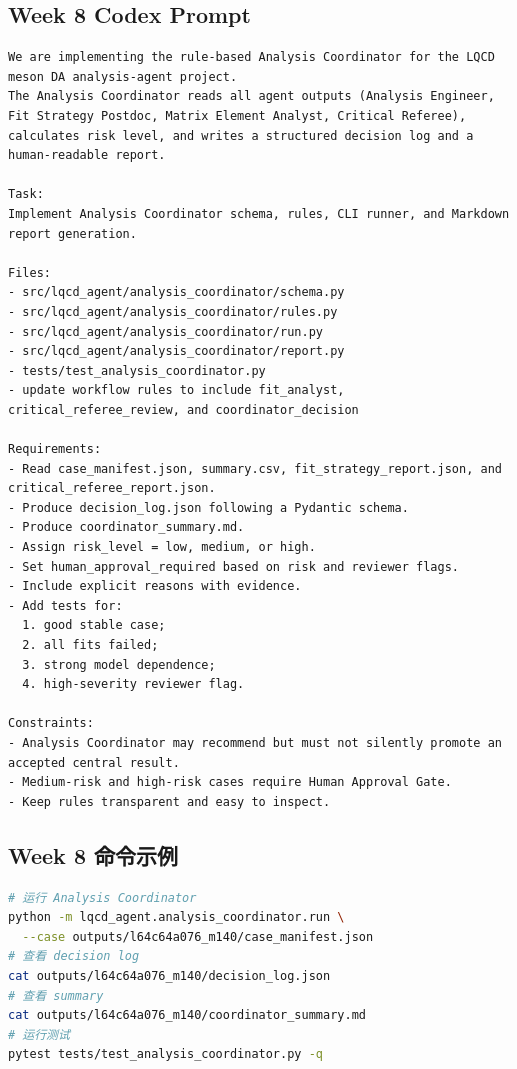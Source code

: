 \documentclass[11pt,a4paper,fontset=none]{ctexart}
\begin{document}
\subsection{Week 8 Codex Prompt}

\begin{lstlisting}
We are implementing the rule-based Analysis Coordinator for the LQCD meson DA analysis-agent project.
The Analysis Coordinator reads all agent outputs (Analysis Engineer, Fit Strategy Postdoc, Matrix Element Analyst, Critical Referee), calculates risk level, and writes a structured decision log and a human-readable report.

Task:
Implement Analysis Coordinator schema, rules, CLI runner, and Markdown report generation.

Files:
- src/lqcd_agent/analysis_coordinator/schema.py
- src/lqcd_agent/analysis_coordinator/rules.py
- src/lqcd_agent/analysis_coordinator/run.py
- src/lqcd_agent/analysis_coordinator/report.py
- tests/test_analysis_coordinator.py
- update workflow rules to include fit_analyst, critical_referee_review, and coordinator_decision

Requirements:
- Read case_manifest.json, summary.csv, fit_strategy_report.json, and critical_referee_report.json.
- Produce decision_log.json following a Pydantic schema.
- Produce coordinator_summary.md.
- Assign risk_level = low, medium, or high.
- Set human_approval_required based on risk and reviewer flags.
- Include explicit reasons with evidence.
- Add tests for:
  1. good stable case;
  2. all fits failed;
  3. strong model dependence;
  4. high-severity reviewer flag.

Constraints:
- Analysis Coordinator may recommend but must not silently promote an accepted central result.
- Medium-risk and high-risk cases require Human Approval Gate.
- Keep rules transparent and easy to inspect.
\end{lstlisting}

\subsection{Week 8 命令示例}
\begin{lstlisting}[language=bash]
# 运行 Analysis Coordinator
python -m lqcd_agent.analysis_coordinator.run \
  --case outputs/l64c64a076_m140/case_manifest.json
# 查看 decision log
cat outputs/l64c64a076_m140/decision_log.json
# 查看 summary
cat outputs/l64c64a076_m140/coordinator_summary.md
# 运行测试
pytest tests/test_analysis_coordinator.py -q
\end{lstlisting}
\end{document}

